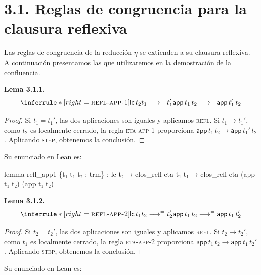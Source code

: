 \documentclass[
  spanish,
  letterpaper,
  DIV=11,
  numbers=noendperiod]{scrreprt}
\newenvironment{Shaded}{\begin{snugshade}}{\end{snugshade}}
\newcommand{\KeywordTok}[1]{\textcolor[rgb]{0.00,0.23,0.31}{\textbf{#1}}}
\newcommand{\NormalTok}[1]{\textcolor[rgb]{0.00,0.23,0.31}{#1}}
\renewcommand{\NormalTok}[1]{\textcolor[HTML]{000000}{#1}}
\renewcommand{\KeywordTok}[1]{\textcolor[HTML]{0000FF}{#1}}
\theoremstyle{remark}
\begin{document}
\section{3.1. Reglas de congruencia para la clausura
reflexiva}\label{reglas-de-congruencia-para-la-clausura-reflexiva}

Las reglas de congruencia de la reducción \(\eta\) se extienden a su
clausura reflexiva. A continuación presentamos las que utilizaremos en
la demostración de la confluencia.

\textbf{Lema 3.1.1.} \[
\inferrule*[right=\textsc{refl-app-1}]
  {\mathsf{lc} \, t_2 \\ 
    t_1 \longrightarrow^{=} t_1'}
  {\mathsf{app}\,t_1\,t_2
   \longrightarrow^{=}
   \mathsf{app}\,t_1'\,t_2}
\]

\begin{proof}
Si \(t_1=t_1'\), las dos aplicaciones son iguales y aplicamos
\textsc{refl}. Si \(t_1\longrightarrow t_1'\), como \(t_2\) es
localmente cerrado, la regla \textsc{eta-app-1} proporciona
\(\mathsf{app} \, t_1 \, t_2 \longrightarrow
\mathsf{app} \, t_1' \, t_2\). Aplicando \textsc{step}, obtenemos la
conclusión.
\end{proof}

Su enunciado en Lean es:

\begin{Shaded}
\begin{Highlighting}[]
\KeywordTok{lemma}\NormalTok{ refl\_app1 \{t₁ t₁\textquotesingle{} t₂ : trm\} :}
\NormalTok{    lc t₂ →}
\NormalTok{    clos\_refl eta t₁ t₁\textquotesingle{} →}
\NormalTok{    clos\_refl eta (app t₁ t₂) (app t₁\textquotesingle{} t₂)}
\end{Highlighting}
\end{Shaded}

\textbf{Lema 3.1.2.} \[
\inferrule*[right=\textsc{refl-app-2}]
  {\mathsf{lc} \, t_1 \\
   t_2 \longrightarrow^{=} t_2'}
  {\mathsf{app}\,t_1\,t_2
   \longrightarrow^{=}
   \mathsf{app} \, t_1 \, t_2'}
\]

\begin{proof}
Si \(t_2=t_2'\), las dos aplicaciones son iguales y aplicamos
\textsc{refl}. Si \(t_2\longrightarrow t_2'\), como \(t_1\) es
localmente cerrado, la regla \textsc{eta-app-2} proporciona
\(\mathsf{app} \, t_1 \, t_2 \longrightarrow
\mathsf{app} \, t_1 \, t_2'\). Aplicando \textsc{step}, obtenemos la
conclusión.
\end{proof}

Su enunciado en Lean es:
\end{document}
